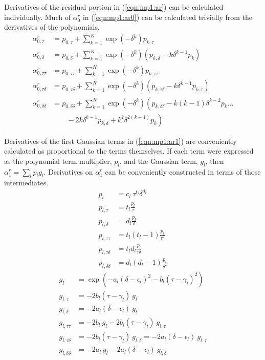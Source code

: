 Derivatives of the residual portion in (\ref{eqn:mp1:ar}) can be calculated individually.  Much of $\alpha^r_0$ in (\ref{eqn:mp1:ar0}) can be calculated trivially from the derivatives of the polynomials. 
\begin{subequations}
\begin{align}
\alpha^r_{0,\tau} &= p_{0,\tau} + \sum_{k=1}^K \exp\left( -\delta^k \right) p_{k,\tau}\\
\alpha^r_{0,\delta} &= p_{0,\delta} + \sum_{k=1}^K \exp\left(-\delta^k\right) \left(p_{k,\delta} - k \delta^{k-1} p_k\right)\\
\alpha^r_{0,\tau\tau} &= p_{0,\tau\tau} + \sum_{k=1}^K \exp\left( -\delta^k \right) p_{k,\tau\tau}\\
\alpha^r_{0,\tau\delta} &= p_{0,\tau\delta} + \sum_{k=1}^K \exp\left(-\delta^k\right) \left(p_{k,\tau\delta} - k \delta^{k-1} p_{k,\tau}\right)\\
\alpha^r_{0,\delta\delta} &= p_{0,\delta\delta} + \sum_{k=1}^K \exp\left(-\delta^k\right) \left(p_{k,\delta\delta} -k(k-1) \delta^{k-2} p_{k} \right. \ldots\nonumber\\
 &\left. \hspace{2em} - 2k\delta^{k-1}p_{k,\delta} +  k^2 \delta^{2(k-1)} p_k\right)
\end{align}
\end{subequations}

Derivatives of the first Gaussian terms in (\ref{eqn:mp1:ar1}) are conveniently calculated as proportional to the terms themselves.  If each term were expressed as the polynomial term multiplier, $p_l$, and the Gaussian term, $g_l$, then $\alpha^r_1 = \sum_l p_l g_l$.  Derivatives on $\alpha^r_1$ can be conveniently constructed in terms of those intermediates.
\begin{subequations}
\begin{align}
p_l &= c_l\ \tau^{t_l} \delta^{d_l}\\
p_{l,\tau} &= t_l \frac{p_l}{\tau}\\
p_{l,\delta} &= d_l \frac{p_l}{\delta}\\
p_{l,\tau\tau} &= t_l(t_l-1) \frac{p_l}{\tau^2}\\
p_{l,\tau\delta} &= t_l d_l \frac{p_l}{\tau\delta}\\
p_{l,\delta\delta} &= d_l (d_l-1) \frac{p_l}{\delta^2}
\end{align}
\end{subequations}
\begin{subequations}
\begin{align}
g_l &= \exp\left( -a_l(\delta-\epsilon_l)^2 - b_l (\tau-\gamma_l)^2 \right)\\
g_{l,\tau} &= -2 b_l (\tau - \gamma_l)\ g_l\\
g_{l,\delta} &= -2 a_l (\delta - \epsilon_l)\ g_l\\
g_{l,\tau\tau} &= -2 b_l\ g_l - 2 b_l (\tau - \gamma_l)\ g_{l,\tau}\\
g_{l,\tau\delta} &= -2 b_l (\tau - \gamma_l)\ g_{l,\delta} = -2 a_l (\delta - \epsilon_l)\ g_{l,\tau}\\
g_{l,\delta\delta} &= -2 a_l\ g_l - 2 a_l (\delta - \epsilon_l)\ g_{l,\delta}
\end{align}
\end{subequations}

